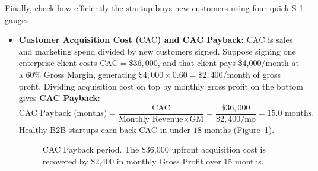 Finally, check how efficiently the startup buys new customers using four quick S-1 gauges:
\begin{itemize}
  \item \textbf{Customer Acquisition Cost ($\text{CAC}$) and CAC Payback:} $\text{CAC}$ is sales and marketing spend divided by new customers signed. Suppose signing one enterprise client costs $\text{CAC} = \$36{,}000$, and that client pays \$4,000/month at a $60\%$ Gross Margin, generating $\$4{,}000 \times 0.60 = \$2{,}400$/month of gross profit. Dividing acquisition cost on top by monthly gross profit on the bottom gives \textbf{CAC Payback}:
  \[
    \text{CAC Payback (months)} = \frac{\text{CAC}}{\text{Monthly Revenue} \times \text{GM}} = \frac{\$36{,}000}{\$2{,}400/\text{mo}} = 15.0\text{ months}.
  \]
  Healthy B2B startups earn back $\text{CAC}$ in under $18$ months (Figure~\ref{fig:ch04-cac-payback}).

\begin{figure}[htbp]
\centering
{}
\caption{CAC Payback period. The \$36,000 upfront acquisition cost is recovered by \$2,400 in monthly Gross Profit over 15 months.}
\label{fig:ch04-cac-payback}
\end{figure}


\end{itemize}
